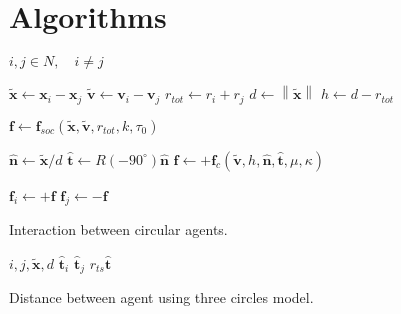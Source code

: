 \section{Algorithms}

\renewcommand{\algorithmiccomment}[1]{{\hspace{1.0 em}\color{gray}\textit{// #1}}}  %

\begin{algorithm}[H]
\begin{algorithmic}[1]  %
\REQUIRE $ i,j \in N, \quad i \neq j $
\ENSURE

\STATE $ \tilde{\mathbf{x}} \gets \mathbf{x}_{i} - \mathbf{x}_{j} $
\STATE $ \tilde{\mathbf{v}} \gets \mathbf{v}_{i} - \mathbf{v}_{j} $
\STATE $ r_{tot} \gets r_{i} + r_{j} $ 
\STATE $ d \gets \left\|\tilde{\mathbf{x}}\right\| $
\STATE $ h \gets d - r_{tot} $
\STATE

\STATE $ \mathbf{f} \gets \mathbf{f}_{soc}(\tilde{\mathbf{x}}, \tilde{\mathbf{v}}, r_{tot}, k, \tau_{0}) $

\STATE

\STATE $ \hat{\mathbf{n}} \gets \tilde{\mathbf{x}} / d $
\STATE $ \hat{\mathbf{t}} \gets R(-90^{\circ}) \hat{\mathbf{n}} $
\STATE $ \mathbf{f} \gets +\mathbf{f}_{c}(\tilde{\mathbf{v}}, h, \hat{\mathbf{n}}, \hat{\mathbf{t}}, \mu, \kappa) $
\ENDIF

\STATE
\STATE $ \mathbf{f}_{i} \gets +\mathbf{f} $
\STATE $ \mathbf{f}_{j} \gets -\mathbf{f} $
\ENDIF
\end{algorithmic}
\caption{Interaction between circular agents.}
\end{algorithm}


\begin{algorithm}[H]
\begin{algorithmic}[1]
\REQUIRE $ i, j, \tilde{\mathbf{x}}, d $
\ENSURE
\STATE $ \hat{\mathbf{t}}_{i} $
\STATE $ \hat{\mathbf{t}}_{j} $
\STATE
\STATE $ r_{ts} \hat{\mathbf{t}} $
\STATE
\FOR{}
\STATE
\ENDFOR
\STATE
\end{algorithmic}
\caption{Distance between agent using three circles model.}
\end{algorithm}


